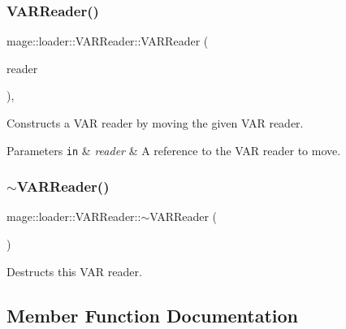 \subsubsection{\texorpdfstring{V\+A\+R\+Reader()}{VARReader()}\hspace{0.1cm}{\footnotesize\ttfamily [3/3]}}
{\footnotesize\ttfamily mage\+::loader\+::\+V\+A\+R\+Reader\+::\+V\+A\+R\+Reader (\begin{DoxyParamCaption}\item[{\mbox{\hyperlink{classmage_1_1loader_1_1_v_a_r_reader}{V\+A\+R\+Reader}} \&\&}]{reader }\end{DoxyParamCaption})\hspace{0.3cm}{\ttfamily [default]}, {\ttfamily [noexcept]}}

Constructs a V\+AR reader by moving the given V\+AR reader.


\begin{DoxyParams}[1]{Parameters}
\mbox{\tt in}  & {\em reader} & A reference to the V\+AR reader to move. \\
\hline
\end{DoxyParams}
\mbox{\label{classmage_1_1loader_1_1_v_a_r_reader_acd3bbd51ccc774d2f74a4520b6143990}} 
\subsubsection{\texorpdfstring{$\sim$\+V\+A\+R\+Reader()}{~VARReader()}}
{\footnotesize\ttfamily mage\+::loader\+::\+V\+A\+R\+Reader\+::$\sim$\+V\+A\+R\+Reader (\begin{DoxyParamCaption}{ }\end{DoxyParamCaption})\hspace{0.3cm}{\ttfamily [default]}}

Destructs this V\+AR reader. 

\subsection{Member Function Documentation}
\mbox{\label{classmage_1_1loader_1_1_v_a_r_reader_aa00e1e27b614e11ec9f70e52d0bac551}} 
